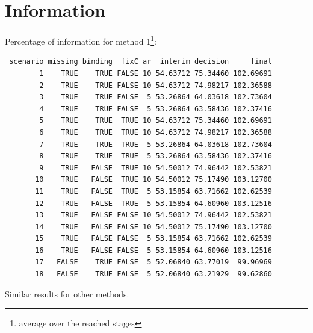\documentclass[12pt]{article}
\begin{document}
\clearpage

\section{Information}
\label{sec:org044dbcb}

Percentage of information for method 1\footnote{average over the reached stages}:
\begin{verbatim}
 scenario missing binding  fixC ar  interim decision     final
        1    TRUE    TRUE FALSE 10 54.63712 75.34460 102.69691
        2    TRUE    TRUE FALSE 10 54.63712 74.98217 102.36588
        3    TRUE    TRUE FALSE  5 53.26864 64.03618 102.73604
        4    TRUE    TRUE FALSE  5 53.26864 63.58436 102.37416
        5    TRUE    TRUE  TRUE 10 54.63712 75.34460 102.69691
        6    TRUE    TRUE  TRUE 10 54.63712 74.98217 102.36588
        7    TRUE    TRUE  TRUE  5 53.26864 64.03618 102.73604
        8    TRUE    TRUE  TRUE  5 53.26864 63.58436 102.37416
        9    TRUE   FALSE  TRUE 10 54.50012 74.96442 102.53821
       10    TRUE   FALSE  TRUE 10 54.50012 75.17490 103.12700
       11    TRUE   FALSE  TRUE  5 53.15854 63.71662 102.62539
       12    TRUE   FALSE  TRUE  5 53.15854 64.60960 103.12516
       13    TRUE   FALSE FALSE 10 54.50012 74.96442 102.53821
       14    TRUE   FALSE FALSE 10 54.50012 75.17490 103.12700
       15    TRUE   FALSE FALSE  5 53.15854 63.71662 102.62539
       16    TRUE   FALSE FALSE  5 53.15854 64.60960 103.12516
       17   FALSE    TRUE FALSE  5 52.06840 63.77019  99.96969
       18   FALSE    TRUE FALSE  5 52.06840 63.21929  99.62860
\end{verbatim}

Similar results for other methods.
\end{document}
